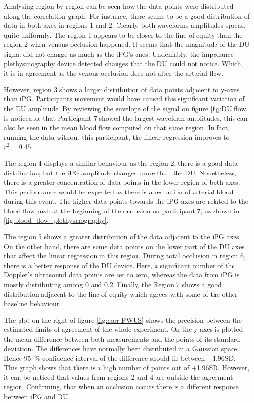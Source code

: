 Analysing region by region can be seen how the data points were distributed along the correlation graph. For instance, there seems to be a good distribution of data in both axes in regions 1 and 2. Clearly, both waveforms amplitudes spread quite uniformly. The region 1 appears to be closer to the line of equity than the region 2 when venous occlusion happened. It seems that the magnitude of the DU signal did not change as much as the iPG's ones. Undeniably, the impedance plethysmography device detected changes that the DU could not notice. Which, it is in agreement as the venous occlusion does not alter the arterial flow. 

However, region 3 shows a larger distribution of data points adjacent to y-axes than iPG. Participants movement would have caused this significant variation of the DU amplitude. By reviewing the envelope of the signal on figure \ref{fig:DU flow} is noticeable that Participant 7 showed the largest waveform amplitudes, this can also be seen in the mean blood flow computed on that same region. In fact, running the data without this participant, the linear regression improves to $r^2 = 0.45$. 

The region 4 displays a similar behaviour as the region 2; there is a good data distribution, but the iPG amplitude changed more than the DU. Nonetheless, there is a greater concentration of data points in the lower region of both axes. This performance would be expected as there is a reduction of arterial blood during this event. The higher data points towards the iPG axes are related to the blood flow rush at the beginning of the occlusion on participant 7, as shown in \ref{fig:blood_flow_plethysmography}.

The region 5 shows a greater distribution of the data adjacent to the iPG axes. On the other hand, there are some data points on the lower part of the DU axes that affect the linear regression in this region. During total occlusion in region 6, there is a better response of the DU device. Here, a significant number of the Doppler's ultrasound data points are set to zero, whereas the data from iPG is mostly distributing among 0 and 0.2. Finally, the Region 7 shows a good distribution adjacent to the line of equity which agrees with some of the other baseline behaviour.

The plot on the right of figure \ref{fig:corr FWUS} shows the precision between the estimated limits of agreement of the whole experiment.  On the y-axes is plotted the mean difference between both measurements and the points of its standard deviation. The differences have normally been distributed in a Gaussian space. Hence \SI{95}{\percent} confidence interval of the difference should lie between  $\pm$1.96SD. This graph shows that there is a high number of points out of $+$1.96SD. However, it can be noticed that values from regions 2 and 4 are outside the agreement region. Confirming, that when an occlusion occurs there is a different response between iPG and DU.


